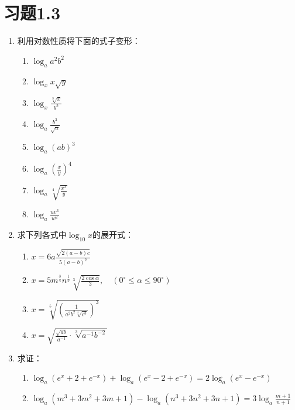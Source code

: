 \section*{习题1.3}
\begin{enumerate}
    \item 利用对数性质将下面的式子变形：
    \begin{multicols}{2}
\begin{enumerate}
    \item $\log_a a^2b^2$
    \item $\log_x x\sqrt{y}$
    \item $\log_x\frac{\sqrt[3]{x}}{y^2}$
    \item $\log_a\frac{b^3}{\sqrt{a}}$
    \item $\log_a(ab)^3$
    \item $\log_a\left(\frac{x}{y}\right)^4$
    \item $\log_a\sqrt[4]{\frac{x^3}{y}}$
    \item $\log_a\frac{uv^3}{w^2}$
\end{enumerate}        
    \end{multicols}

\item 求下列各式中$\log_{10}x$的展开式：
\begin{enumerate}
    \item $x=6a\frac{\sqrt{2(a-b)c}}{5(a-b)^2}$
    \item $x=5m^{\tfrac{3}{4}}n^{\tfrac{1}{3}}\sqrt[3]{\frac{2\cos\alpha}{3}},\quad (0^{\circ}\le \alpha\le 90^{\circ})$
    \item $x=\sqrt[5]{\left(\frac{1}{a^2b^2\sqrt[4]{c^3}}\right)^3}$
    \item $x=\sqrt{\frac{\sqrt{ab}}{a^{-1}}\cdot \sqrt[3]{a^{-1}b^{-2}}}$
\end{enumerate}
\item 求证：
\begin{enumerate}
    \item $\log_a (e^x+2+e^{-x})+\log_a(e^x-2+e^{-x})=2\log_a(e^x-e^{-x})$
    \item $\log_a(m^3+3m^2+3m+1)-\log_a(n^3+3n^2+3n+1)=3\log_a\frac{m+1}{n+1}$
\end{enumerate}


\end{enumerate}
